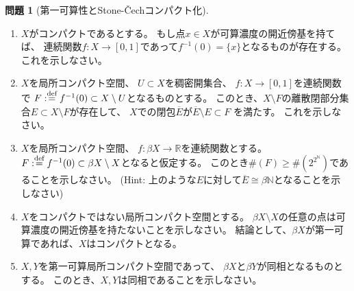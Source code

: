 \documentclass[uplatex]{jsarticle}
\theoremstyle{definition}
\newtheorem{prob}[prob]{問題}
\newcommand{\dfn}{:\overset{\mbox{{\scriptsize def}}}{=}}
\newcommand{\R}{\mathbb{R}}
\newcommand{\N}{\mathbb{N}}
\begin{document}
\begin{prob}[第一可算性とStone-\v{C}echコンパクト化]
  \
  \begin{enumerate}
    \item
    \(X\)がコンパクトであるとする。
    もし点\(x\in X\)が可算濃度の開近傍基を持てば、
    連続関数\(f:X\to [0,1]\)であって\(f^{-1}(0) = \{x\}\)となるものが存在する。
    これを示しなさい。
    \item
    \(X\)を局所コンパクト空間、
    \(U\subset X\)を稠密開集合、
    \(f:X \to [0,1]\)を連続関数で
    \(F\dfn f^{-1}(0)\subset X\setminus U\)となるものとする。
    このとき、\(X\setminus F\)の離散閉部分集合\(E\subset X\setminus F\)が存在して、
    \(X\)での閉包\(\overline{E}\)が\(\overline{E}\setminus E\subset F\)
    を満たす。
    これを示しなさい。
    \item
    \(X\)を局所コンパクト空間、
    \(f:\beta X \to \R\)を連続関数とする。
    \(F\dfn f^{-1}(0)\subset \beta X \setminus X\)となると仮定する。
    このとき\(\#(F) \geq \#(2^{2^{\N}})\)であることを示しなさい。
    (Hint: 上のような\(E\)に対して\(\overline{E}\cong \beta \N\)となることを示しなさい)
    \item
    \(X\)をコンパクトではない局所コンパクト空間とする。
    \(\beta X\setminus X\)の任意の点は可算濃度の開近傍基を持たないことを示しなさい。
    結論として、\(\beta X\)が第一可算であれば、\(X\)はコンパクトとなる。
    \item
    \(X,Y\)を第一可算局所コンパクト空間であって、
    \(\beta X\)と\(\beta Y\)が同相となるものとする。
    このとき、\(X,Y\)は同相であることを示しなさい。
  \end{enumerate}
\end{prob}
\end{document}

